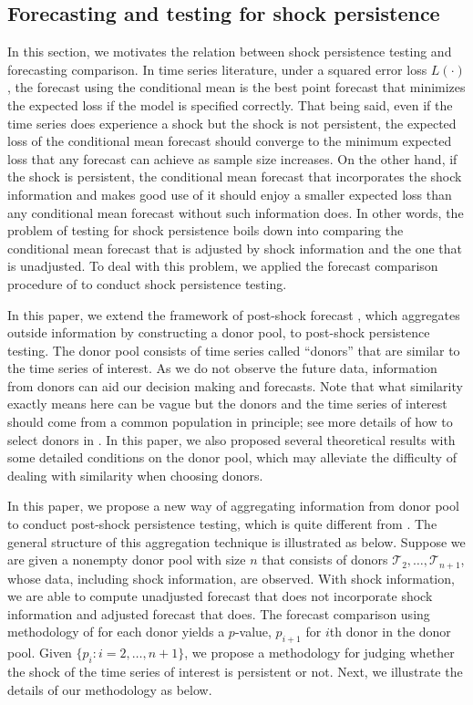 \documentclass[11pt]{article}
\def\mc#1{\mathcal{#1}} %
\def\mc#1{\mathcal{#1}}
\theoremstyle{definition}
\begin{document}
\subsection{Forecasting and testing for shock persistence}
\label{forecast}


In this section, we motivates the relation between shock persistence testing and forecasting comparison. In time series literature, under a squared error loss $L(\cdot)$, the forecast using the conditional mean is the best point forecast that minimizes the expected loss if the model is specified correctly. That being said, even if the time series does experience a shock but the shock is not persistent, the expected loss of the conditional mean forecast should converge to the minimum expected loss that any forecast can achieve as sample size increases. On the other hand, if the shock is persistent, the conditional mean forecast that incorporates the shock information and makes good use of it should enjoy a smaller expected loss than any conditional mean forecast without such information does. In other words, the problem of testing for shock persistence boils down into comparing the conditional mean forecast that is adjusted by shock information and the one that is unadjusted. To deal with this problem, we applied the forecast comparison procedure of  \cite{quaedvlieg2021multi} to conduct shock persistence testing.

In this paper, we extend the framework of post-shock forecast \citep{lin2021minimizing}, which aggregates outside information by constructing a donor pool, to post-shock persistence testing. The donor pool consists of time series called  ``donors'' that are similar to the time series of interest. As we do not observe the future data, information from donors can aid our decision making and forecasts. Note that what  similarity exactly means here can be vague but the donors and the time series of interest should come from a common population in principle; see more details of how to select donors in \cite{lin2021minimizing}. In this paper, we also proposed several theoretical results with some detailed conditions on the donor pool, which may alleviate the difficulty of dealing with similarity when choosing donors.


In this paper, we propose a new way of aggregating information from donor pool to conduct post-shock persistence testing, which is quite different from \cite{lin2021minimizing}. The general structure of this aggregation technique is illustrated as below. Suppose we are given a nonempty donor pool with size $n$ that consists of donors $\mc{T}_2, \ldots, \mc{T}_{n+1}$, whose data, including shock information, are observed. With shock information, we are able to compute unadjusted forecast that does not incorporate shock information and adjusted forecast that does.  The forecast comparison using methodology of \cite{quaedvlieg2021multi} for each donor yields a $p$-value, $p_{i+1}$ for $i$th donor in the donor pool. Given $\{p_i \colon i = 2, \ldots, n+1\}$, we propose a methodology for judging whether the shock of the time series of interest is persistent or not. Next, we illustrate the details of our methodology as below.
\end{document}
